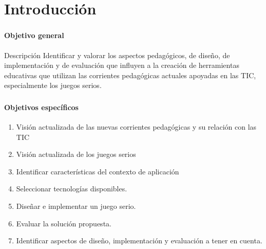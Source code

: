 \section{Introducción}
\setcounter{sectiontotal}{2}

\begin{frame}
\frametitle{\pagetitle}
\framesubtitle{Objetivo general}
\begin{block}{Descripción}
\centering
Identificar y valorar los aspectos pedagógicos, de diseño, de implementación y
de evaluación que influyen a la creación de herramientas educativas que utilizan
las corrientes pedagógicas actuales apoyadas en las TIC, especialmente los
juegos serios.
\end{block}


\end{frame}

\begin{frame}
\frametitle{\pagetitle}
\framesubtitle{Objetivos específicos}
\begin{enumerate}[<+->]
\item Visión actualizada de las nuevas corrientes pedagógicas y su relación con
    las TIC
\item Visión actualizada de los juegos serios
\item Identificar características del contexto de aplicación
\item Seleccionar tecnologías disponibles.
\item Diseñar e implementar un juego serio.
\item Evaluar la solución propuesta.
\item Identificar aspectos de diseño, implementación y evaluación a tener en cuenta.
\end{enumerate}
\end{frame}

